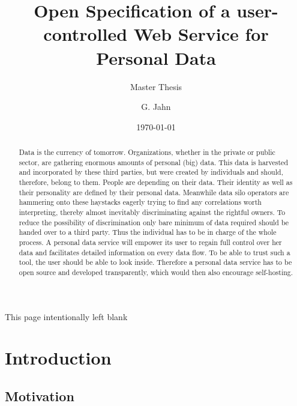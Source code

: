 \documentclass[12pt,english,a4paper,titlepage,cleardoublepage=empty,dottedtoc]{report}
\title{Open Specification of a user-controlled Web Service for Personal Data}
\subtitle{Master Thesis}
\author{G. Jahn}
\date{\today}
\begin{document}
\maketitle
\begin{abstract}
Data is the currency of tomorrow. Organizations, whether in the private
or public sector, are gathering enormous amounts of personal (big) data.
This data is harvested and incorporated by these third parties, but were
created by individuals and should, therefore, belong to them. People are
depending on their data. Their identity as well as their personality are
defined by their personal data. Meanwhile data silo operators are
hammering onto these haystacks eagerly trying to find any correlations
worth interpreting, thereby almost inevitably discriminating against the
rightful owners. To reduce the possibility of discrimination only bare
minimum of data required should be handed over to a third party. Thus
the individual has to be in charge of the whole process. A personal data
service will empower its user to regain full control over her data and
facilitates detailed information on every data flow. To be able to trust
such a tool, the user should be able to look inside. Therefore a
personal data service has to be open source and developed transparently,
which would then also encourage self-hosting.
\end{abstract}

{
\setcounter{tocdepth}{1}
\tableofcontents
}
\newpage
\listoftables
\newpage
\listoffigures
\newpage

\begin{center}
This page intentionally left blank
\end{center}\newpage

\chapter{Introduction}\label{introduction}

\section{Motivation}\label{motivation}
\end{document}
